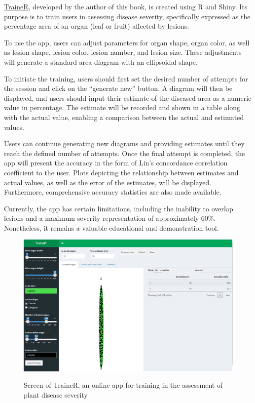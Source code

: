 \documentclass[
  letterpaper,
]{book}
\begin{document}
\href{https://edelponte.shinyapps.io/traineR/}{TraineR}, developed by
the author of this book, is created using R and Shiny. Its purpose is to
train users in assessing disease severity, specifically expressed as the
percentage area of an organ (leaf or fruit) affected by lesions.

To use the app, users can adjust parameters for organ shape, organ
color, as well as lesion shape, lesion color, lesion number, and lesion
size. These adjustments will generate a standard area diagram with an
ellipsoidal shape.

To initiate the training, users should first set the desired number of
attempts for the session and click on the ``generate new'' button. A
diagram will then be displayed, and users should input their estimate of
the diseased area as a numeric value in percentage. The estimate will be
recorded and shown in a table along with the actual value, enabling a
comparison between the actual and estimated values.

Users can continue generating new diagrams and providing estimates until
they reach the defined number of attempts. Once the final attempt is
completed, the app will present the accuracy in the form of Lin's
concordance correlation coefficient to the user. Plots depicting the
relationship between estimates and actual values, as well as the error
of the estimates, will be displayed. Furthermore, comprehensive accuracy
statistics are also made available.

Currently, the app has certain limitations, including the inability to
overlap lesions and a maximum severity representation of approximately
60\%. Nonetheless, it remains a valuable educational and demonstration
tool.

\begin{figure}

{\centering 

\href{https://edelponte.shinyapps.io/traineR/}{\includegraphics[width=4.47917in,height=\textheight]{imgs/trainer.png}}

}

\caption{\label{fig-trainer}Screen of TraineR, an online app for
training in the assessment of plant disease severity}

\end{figure}
\end{document}
